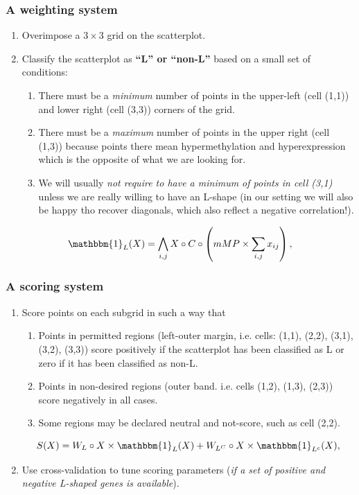 \documentclass[handout]{beamer}
\begin{document}
\begin{frame}
	\frametitle{A weighting system}
	\begin{enumerate}
		\item Overimpose a $3\times 3$ grid on the scatterplot.
		\item Classify the scatterplot as \textbf{``L'' or ``non-L''} based on a small set of conditions:
		\begin{enumerate}
			\item There must be a \emph{minimum} number of points in the upper-left (cell (1,1)) and lower right (cell (3,3)) corners of the grid.
			\item There must be a \emph{maximum} number of points in the upper right (cell (1,3)) because points there mean hypermethylation and hyperexpression which is the opposite of what we are looking for.
			\item We will usually \emph{not require to have a minimum of points in cell (3,1)} unless we are really willing to have an L-shape (in our setting we will also be happy tho recover diagonals, which also reflect a negative correlation!).
		\end{enumerate}
	\end{enumerate}
{
\begin{equation*}
\mathbbm{1}_L(X) = \bigwedge_{i,j} X \circ C \circ \left( mMP \times \sum_{i,j}x_{ij}\right),
\end{equation*}
}

\end{frame}

\begin{frame}
	\frametitle{A scoring system}
		\begin{enumerate}
			\item Score points on each subgrid in such a way that
			\begin{enumerate}
				\item Points in permitted regions (left-outer margin, i.e. cells: (1,1), (2,2), (3,1), (3,2), (3,3)) score positively if the scatterplot has been classified as L or zero if it has been classified as non-L.
				\item Points in non-desired regions (outer band. i.e. cells (1,2), (1,3), (2,3)) score negatively in all cases.
				\item Some regions may be declared neutral and not-score, such as cell (2,2).
			\end{enumerate}
			{
			\begin{equation*}
			S(X) = W_L \circ X \times \mathbbm{1}_L(X) + W_{L^C} \circ X \times \mathbbm{1}_{L^c}(X),
			\end{equation*}
		    }
			\item Use cross-validation to tune scoring parameters (\emph{if a set of positive and negative L-shaped genes is available}).
		\end{enumerate}
	

\end{frame}
\end{document}
